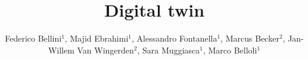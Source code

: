 \documentclass[final,5p,times,twocolumn]{elsarticle}
\begin{document}
\begin{frontmatter}



\title{Digital twin}

\author{Federico Bellini$^1$, Majid Ebrahimi$^1$, Alessandro Fontanella$^1$, 
Marcus Becker$^2$, Jan-Willem Van Wingerden$^2$, 
Sara Muggiasca$^1$, Marco Belloli$^1$}

\address{$^1$ Mechanical Engineering Department, Politecnico di Milano, 
Milano, Italy}
\address{$^2$ Delft Center for Systems and Control, TU Delft, Delft, 
Netherlands}



\author{} %


\begin{abstract}


\end{abstract}
\end{frontmatter}
\end{document}
